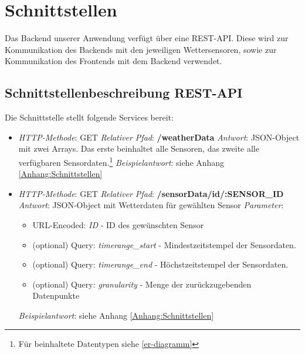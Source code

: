 \section{Schnittstellen}\label{Schnittstellen}
Das Backend unserer Anwendung verfügt über eine REST-API. Diese wird zur Kommunikation des Backends mit den jeweiligen Wettersensoren, sowie zur Kommunikation des Frontends mit dem Backend verwendet.

\subsection*{Schnittstellenbeschreibung REST-API}\label{schnittstellen:rest}
Die Schnittstelle stellt folgende Services bereit:

\begin{itemize}
    \item \textsl{HTTP-Methode}: GET
    \subitem \textsl{Relativer Pfad}: \textbf{/weatherData}
    \subitem \textsl{Antwort}: JSON-Object mit zwei Arrays.
    Das erste beinhaltet alle Sensoren, das zweite alle verfügbaren Sensordaten.\footnote{Für beinhaltete Datentypen siehe \cref{er-diagramm}}
    \subitem \textsl{Beispielantwort}: siehe Anhang \ref{Anhang:Schnittstellen}
\end{itemize}

\begin{itemize}
    \item \textsl{HTTP-Methode}: GET
    \subitem \textsl{Relativer Pfad}: \textbf{/sensorData/id/:SENSOR\_ID}
    \subitem \textsl{Antwort}: JSON-Object mit Wetterdaten für gewählten Sensor
    \subitem \textsl{Parameter}: \begin{itemize}
                                     \item URL-Encoded: \textit{ID} - ID des gewünschten Sensor
                                     \item (optional) Query:    \textit{timerange\_start} - Mindestzeitstempel der Sensordaten.
                                     \item (optional) Query:    \textit{timerange\_end} - Höchstzeitstempel der Sensordaten.
                                     \item (optional) Query: \textit{granularity} - Menge der zurückzugebenden Datenpunkte
    \end{itemize}
    \subitem \textsl{Beispielantwort}: siehe Anhang \ref{Anhang:Schnittstellen}
\end{itemize}

